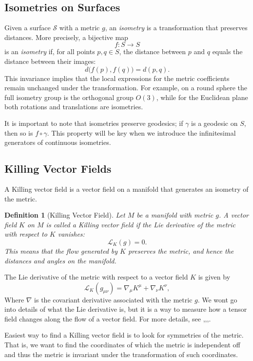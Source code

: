 \documentclass[12pt]{article}
\newtheorem{definition}{Definition}[section]
\begin{document}
\subsection{Isometries on Surfaces}
Given a surface $\mathcal{S}$ with a metric $g$, an \emph{isometry} is a transformation that preserves distances. More precisely, a bijective map
\[
f: S \to S
\]
is an \emph{isometry} if, for all points $p,q\in S$, the distance between $p$ and $q$ equals the distance between their images:
\[
d\big(f(p),f(q)\big)=d(p,q).
\]
This invariance implies that the local expressions for the metric coefficients remain unchanged under the transformation. 
For example, on a round sphere the full isometry group is the orthogonal group $O(3)$, while for the Euclidean plane both rotations and translations are isometries.

It is important to note that isometries preserve geodesics; if $\gamma$ is a geodesic on $S$, then so is $f\circ\gamma$. 
This property will be key when we introduce the infinitesimal generators of continuous isometries.


\subsection{Killing Vector Fields}
A Killing vector field is a vector field on a manifold that generates an isometry of the metric.

\begin{definition}[Killing Vector Field]
	Let \(M\) be a manifold with metric \(g\). A vector field \(K\) on \(M\) is called a \emph{Killing vector field} if the Lie derivative of the metric with respect to \(K\) vanishes:
	\[
		\mathcal{L}_{K} (g) = 0.
	\]
	This means that the flow generated by \(K\) preserves the metric, and hence the distances and angles on the manifold.
\end{definition}
The Lie derivative of the metric with respect to a vector field \(K\) is given by
\[
	\mathcal{L}_{K} (g_{\mu\nu}) = \nabla_{\mu} K^{\mu} + \nabla_{\nu} K^{\nu},
\]
Where \(\nabla\) is the covariant derivative associated with the metric \(g\).
We wont go into details of what the Lie derivative is, but it is a way to measure how a tensor field changes along the flow of a vector field.
For more details, see \cite{oprea2007differential},\cite{note32020covariant},\cite{atkins2018solving},\cite{carrol2019spacetime}.


Easiest way to find a Killing vector field is to look for symmetries of the metric.
That is, we want to find the coordinates of which the metric is independent off and thus the metric is invariant under the transformation of such coordinates.
\end{document}
